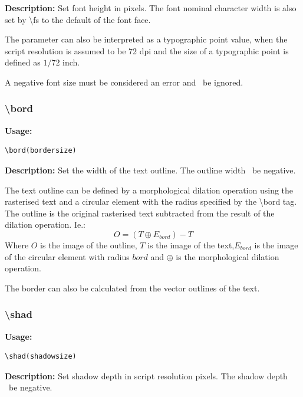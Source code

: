 \documentclass{spec}
\begin{document}
\textbf{Description:}
Set font height in pixels. The font nominal character width is also set by \textbackslash fs to the default
of the font face.

The parameter can also be interpreted as a typographic point value, when
the script resolution is assumed to be 72 dpi and the size of a typographic point is defined as
$1/72$ inch.


A negative font size must be considered an error and \must\ be ignored.

\subsubsection{\textbackslash bord}
\textbf{Usage:}
\begin{verbatim}
\bord(bordersize)
\end{verbatim}

\textbf{Description:}
Set the width of the text outline. The outline width \mustnot\ be negative.

The text outline can be defined by a morphological dilation operation using the rasterised text
and a circular element with the radius specified by the \textbackslash bord tag. The outline is the
original rasterised text subtracted from the result of the dilation operation. Ie.:
\[O = (T \oplus E_{bord}) - T\]
Where $O$ is the image of the outline, $T$ is the image of the text,$E_{bord}$ is the image of the
circular element with radius $bord$ and $\oplus$ is the morphological dilation operation.

The border can also be calculated from the vector outlines of the text.



\subsubsection{\textbackslash shad}
\textbf{Usage:}
\begin{verbatim}
\shad(shadowsize)
\end{verbatim}

\textbf{Description:}
Set shadow depth in script resolution pixels. The shadow depth \mustnot\ be negative.

\end{document}
